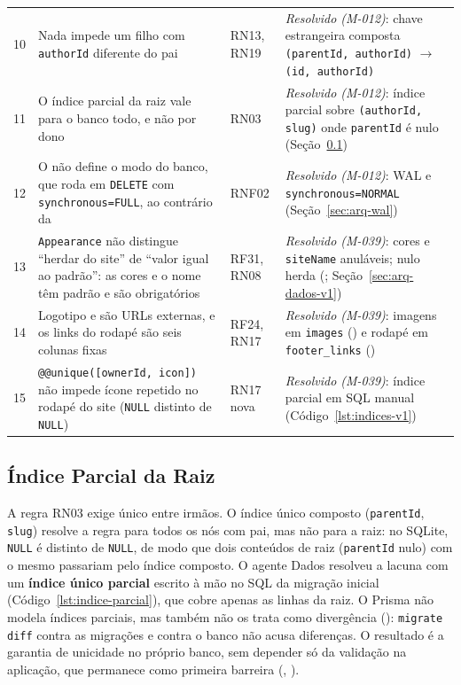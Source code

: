 \begin{longtable}{@{}L{0.8cm}L{5.6cm}L{2.2cm}L{4.8cm}@{}}
10 & Nada impede um filho com \texttt{authorId} diferente do pai & RN13, RN19 & \emph{Resolvido (M-012)}: chave estrangeira composta \texttt{(parentId, authorId)} $\rightarrow$ \texttt{(id, authorId)}\\[1pt]
11 & O índice parcial da raiz vale para o banco todo, e não por dono & RN03 & \emph{Resolvido (M-012)}: índice parcial sobre \texttt{(authorId, slug)} onde \texttt{parentId} é nulo (Seção~\ref{sec:arq-indice-parcial})\\[1pt]
12 & O  não define o modo do banco, que roda em \texttt{DELETE} com \texttt{synchronous=FULL}, ao contrário da  & RNF02 & \emph{Resolvido (M-012)}: WAL e \texttt{synchronous=NORMAL} (Seção~\ref{sec:arq-wal})\\[1pt]
13 & \texttt{Appearance} não distingue ``herdar do site'' de ``valor igual ao padrão'': as cores e o nome têm padrão e são obrigatórios & RF31, RN08 & \emph{Resolvido (M-039)}: cores e \texttt{siteName} anuláveis; nulo herda (; Seção~\ref{sec:arq-dados-v1})\\[1pt]
14 & Logotipo e  são URLs externas, e os links do rodapé são seis colunas fixas & RF24, RN17 & \emph{Resolvido (M-039)}: imagens em \texttt{images} () e rodapé em \texttt{footer\_links} ()\\[1pt]
15 & \texttt{@@unique([ownerId, icon])} não impede ícone repetido no rodapé do site (\texttt{NULL} distinto de \texttt{NULL}) & RN17 nova & \emph{Resolvido (M-039)}: índice parcial em SQL manual (Código~\ref{lst:indices-v1})\\[1pt]
\end{longtable}

\subsection{Índice Parcial da Raiz}\label{sec:arq-indice-parcial}

A regra RN03 exige  único entre irmãos. O índice único composto (\texttt{parentId}, \texttt{slug}) resolve a regra para todos os nós com pai, mas não para a raiz: no SQLite, \texttt{NULL} é distinto de \texttt{NULL}, de modo que dois conteúdos de raiz (\texttt{parentId} nulo) com o mesmo  passariam pelo índice composto. O agente Dados resolveu a lacuna com um \textbf{índice único parcial} escrito à mão no SQL da migração inicial (Código~\ref{lst:indice-parcial}), que cobre apenas as linhas da raiz. O Prisma não modela índices parciais, mas também não os trata como divergência (): \texttt{migrate diff} contra as migrações e contra o banco não acusa diferenças. O resultado é a garantia de unicidade no próprio banco, sem depender só da validação na aplicação, que permanece como primeira barreira (, ).

